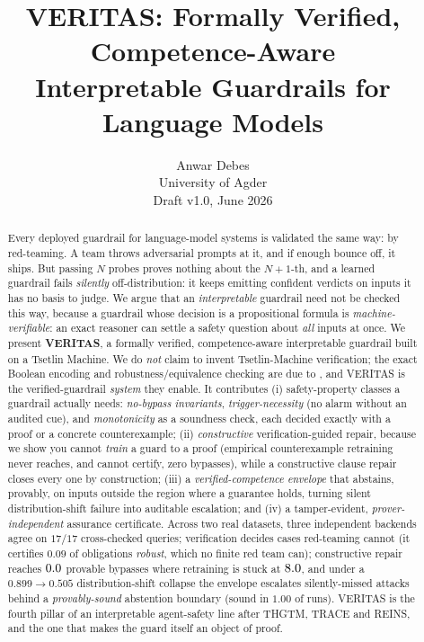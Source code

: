 \documentclass[11pt]{article}
\title{\textbf{VERITAS: Formally Verified, Competence-Aware\\
Interpretable Guardrails for Language Models}}
\author{Anwar Debes\\
University of Agder\\
\vspace{0.4em}\small Draft v1.0, June 2026}
\date{}
\newcommand{\soundChecks}{17}\newcommand{\soundAgree}{17}
\newcommand{\robustFrac}{0.09}\newcommand{\bypassFrac}{0.91}
\newcommand{\plainIn}{0.899}\newcommand{\plainOut}{0.505}
\newcommand{\soundRate}{1.00}\newcommand{\covEnv}{0.62}\newcommand{\covBase}{0.94}
\begin{document}
\maketitle

\begin{abstract}
Every deployed guardrail for language-model systems is validated the same way: by
red-teaming. A team throws adversarial prompts at it, and if enough bounce off, it
ships. But passing $N$ probes proves nothing about the $N{+}1$-th, and a learned
guardrail fails \emph{silently} off-distribution: it keeps emitting confident
verdicts on inputs it has no basis to judge. We argue that an \emph{interpretable}
guardrail need not be checked this way, because a guardrail whose decision is a
propositional formula is \emph{machine-verifiable}: an exact reasoner can settle a
safety question about \emph{all} inputs at once. We present \textbf{VERITAS}, a
formally verified, competence-aware interpretable guardrail built on a Tsetlin
Machine. We do \emph{not} claim to invent Tsetlin-Machine verification; the exact
Boolean encoding and robustness/equivalence checking are due to
\citet{przybysz2023verifying}, and VERITAS is the verified-guardrail \emph{system} they
enable. It contributes (i) safety-property classes a guardrail actually needs: \emph{no-bypass invariants}, \emph{trigger-necessity} (no alarm without an audited
cue), and \emph{monotonicity} as a soundness check, each decided exactly with a
proof or a concrete counterexample; (ii) \emph{constructive} verification-guided
repair, because we show you cannot \emph{train} a guard to a proof (empirical
counterexample retraining never reaches, and cannot certify, zero bypasses), while a
constructive clause repair closes every one by construction; (iii) a
\emph{verified-competence envelope} that abstains, provably, on inputs outside
the region where a guarantee holds, turning silent distribution-shift failure into
auditable escalation; and (iv) a tamper-evident, \emph{prover-independent}
assurance certificate. Across two real datasets, three independent backends agree
on $\soundAgree/\soundChecks$ cross-checked queries; verification decides cases
red-teaming cannot (it certifies $\robustFrac$ of obligations \emph{robust}, which
no finite red team can); constructive repair reaches $0.0$ provable bypasses
where retraining is stuck at $8.0$, and under a $\plainIn{\to}\plainOut$
distribution-shift collapse the envelope escalates silently-missed attacks behind a
\emph{provably-sound} abstention boundary (sound in $\soundRate$ of runs). VERITAS is the fourth pillar of an
interpretable agent-safety line after THGTM, TRACE and REINS, and the one that
makes the guard itself an object of proof.
\end{abstract}
\end{document}

